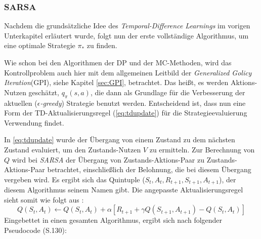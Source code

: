 \subsubsection{SARSA}
Nachdem die grundsätzliche Idee des \textit{Temporal-Difference Learnings} im vorigen Unterkapitel erläutert wurde, folgt nun der erste vollständige Algorithmus, um eine optimale Strategie $\pi_*$ zu finden.
\par 
Wie schon bei den Algorithmen der DP und der MC-Methoden, wird das Kontrollproblem auch hier mit dem allgemeinen Leitbild der \textit{Generalized Golicy Iteration}(GPI), siehe Kapitel \ref{sec:GPI}, betrachtet. Das heißt, es werden Aktions-Nutzen geschätzt, $q_\pi(s,a)$, die dann als Grundlage für die Verbesserung der aktuellen ($\epsilon$\textit{-greedy}) Strategie benutzt werden. Entscheidend ist, dass nun eine Form der TD-Aktualisierungsregel (\ref{eq:tdupdate}) für die Strategieevaluierung Verwendung findet.
\par 
In \ref{eq:tdupdate} wurde der Übergang von einem Zustand zu dem nächsten Zustand evaluiert, um den Zustands-Nutzen $V$ zu ermitteln. Zur Berechnung von $Q$ wird bei \textit{SARSA} der Übergang von Zustands-Aktions-Paar zu Zustands-Aktions-Paar betrachtet, einschließlich der Belohnung, die bei diesem Übergang vergeben wird. Es ergibt sich das Quintuple ($S_t, A_t, R_{t+1}, S_{t+1}, A_{t+1}$), der diesem Algorithmus seinem Namen gibt. Die angepasste Aktualisierungsregel sieht somit wie folgt aus \cite[S.~129]{Sutton1998}:
\begin{equation}
    Q(S_t, A_t) \gets Q(S_t, A_t) + \alpha \left[R_{t+1} + \gamma Q(S_{t+1}, A_{t+1}) - Q(S_t, A_t)\right]
\end{equation}
Eingebettet in einen gesamten Algorithmus, ergibt sich nach \cite{Sutton1998} folgender Pseudocode (S.130): 
\pagebreak

